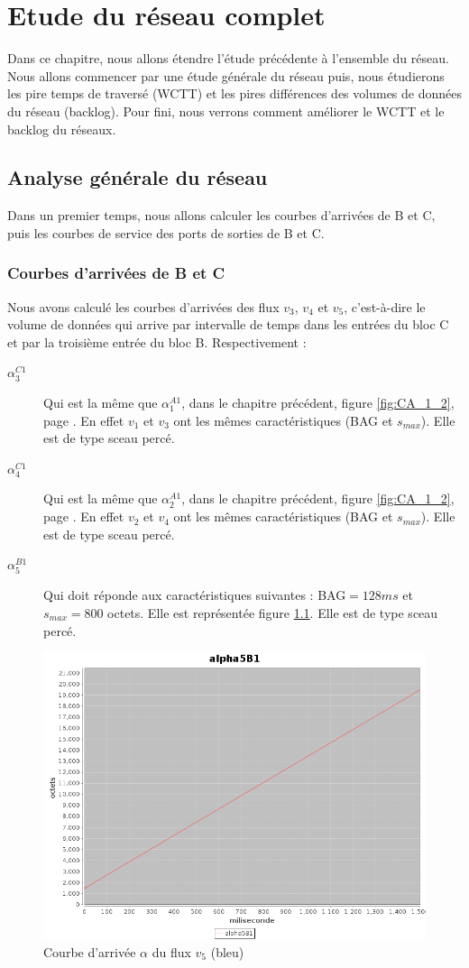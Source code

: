 \chapter{Etude du réseau complet}
Dans ce chapitre, nous allons étendre l'étude précédente à l'ensemble du réseau.
Nous allons commencer par une étude générale du réseau puis, nous étudierons les pire temps de traversé (WCTT) et les pires différences des volumes de données du réseau (backlog). Pour fini, nous verrons comment améliorer le WCTT et le backlog du réseaux.
\section{Analyse générale du réseau}
Dans un premier temps, nous allons calculer les courbes d'arrivées de B et C, puis les courbes de service des ports de sorties de B et C.
\subsection{Courbes d’arrivées de B et C}\label{sub:courbesArriveesB-C}
Nous avons calculé les courbes d'arrivées des flux $v_3$, $v_4$ et $v_5$, c'est-à-dire le volume de données qui arrive par intervalle de temps dans les entrées du bloc C et par la troisième entrée du bloc B. Respectivement : 
\begin{description}
\item[$\alpha_3^{C1}$ ] Qui est la même que $\alpha_1^{A1}$, dans le chapitre précédent, figure \ref{fig:CA_1_2}, page \pageref{fig:CA_1_2}. En effet $v_1$ et $v_3$ ont les mêmes caractéristiques (BAG et $s_{max}$). Elle est de type sceau percé.

\item[$\alpha_4^{C1}$ ] Qui est la même que $\alpha_2^{A1}$, dans le chapitre précédent, figure \ref{fig:CA_1_2}, page \pageref{fig:CA_1_2}. En effet $v_2$ et $v_4$ ont les mêmes caractéristiques (BAG et $s_{max}$). Elle est de type sceau percé.

\item[$\alpha_5^{B1}$ ] Qui doit réponde aux  caractéristiques suivantes : BAG$=128 ms$ et $s_{max}=800$ octets. Elle est représentée figure \ref{fig:CA_5}. Elle est de type sceau percé.
\end{description}

\begin{figure}[!ht]
\centering
\includegraphics[width = .6\textwidth]{./II/images/alpha_5.png}
\caption{\label{fig:CA_5}Courbe d'arrivée $\alpha$ du flux $v_5$ (bleu)}
\end{figure} 
